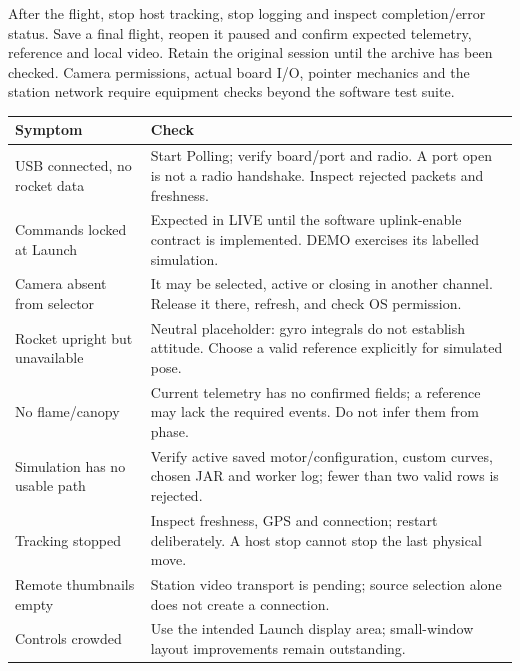 After the flight, stop host tracking, stop logging and inspect completion/error
status. Save a final flight, reopen it paused and confirm expected telemetry,
reference and local video. Retain the original session until the archive has
been checked. Camera permissions, actual board I/O, pointer mechanics and the
station network require equipment checks beyond the software test suite.

\begin{longtable}{@{}L{.31\linewidth}L{.62\linewidth}@{}}
\toprule Symptom & Check \\\midrule\endhead
USB connected, no rocket data & Start Polling; verify board/port and radio. A port open is not a radio handshake. Inspect rejected packets and freshness. \\
Commands locked at Launch & Expected in LIVE until the software uplink-enable contract is implemented. DEMO exercises its labelled simulation. \\
Camera absent from selector & It may be selected, active or closing in another channel. Release it there, refresh, and check OS permission. \\
Rocket upright but unavailable & Neutral placeholder: gyro integrals do not establish attitude. Choose a valid reference explicitly for simulated pose. \\
No flame/canopy & Current telemetry has no confirmed fields; a reference may lack the required events. Do not infer them from phase. \\
Simulation has no usable path & Verify active saved motor/configuration, custom curves, chosen JAR and worker log; fewer than two valid rows is rejected. \\
Tracking stopped & Inspect freshness, GPS and connection; restart deliberately. A host stop cannot stop the last physical move. \\
Remote thumbnails empty & Station video transport is pending; source selection alone does not create a connection. \\
Controls crowded & Use the intended Launch display area; small-window layout improvements remain outstanding. \\
\bottomrule
\end{longtable}
